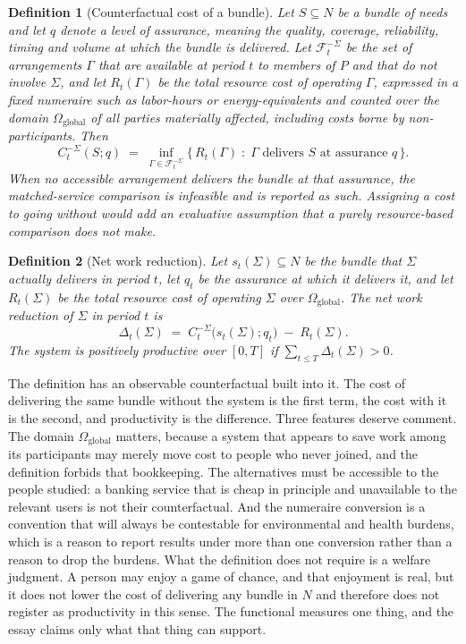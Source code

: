\documentclass[11pt]{article}
\newtheorem{definition}{Definition}
\theoremstyle{remark}
\begin{document}
\begin{definition}[Counterfactual cost of a bundle]\label{def:cost}
Let $S\subseteq N$ be a bundle of needs and let $q$ denote a level of assurance, meaning the quality, coverage, reliability, timing and volume at which the bundle is delivered. Let $\mathcal F_t^{-\Sigma}$ be the set of arrangements $\Gamma$ that are available at period $t$ to members of $P$ and that do not involve $\Sigma$, and let $R_t(\Gamma)$ be the total resource cost of operating $\Gamma$, expressed in a fixed numeraire such as labor-hours or energy-equivalents and counted over the domain $\Omega_{\mathrm{global}}$ of all parties materially affected, including costs borne by non-participants. Then
\[
C_t^{-\Sigma}(S;q)\;=\;\inf_{\Gamma\in\mathcal F_t^{-\Sigma}}\bigl\{\,R_t(\Gamma)\;:\;\Gamma\text{ delivers }S\text{ at assurance }q\,\bigr\}.
\]
When no accessible arrangement delivers the bundle at that assurance, the matched-service comparison is infeasible and is reported as such. Assigning a cost to going without would add an evaluative assumption that a purely resource-based comparison does not make.
\end{definition}

\begin{definition}[Net work reduction]\label{def:delta}
Let $s_t(\Sigma)\subseteq N$ be the bundle that $\Sigma$ actually delivers in period $t$, let $q_t$ be the assurance at which it delivers it, and let $R_t(\Sigma)$ be the total resource cost of operating $\Sigma$ over $\Omega_{\mathrm{global}}$. The net work reduction of $\Sigma$ in period $t$ is
\[
\Delta_t(\Sigma)\;=\;C_t^{-\Sigma}\bigl(s_t(\Sigma);q_t\bigr)\;-\;R_t(\Sigma).
\]
The system is \emph{positively productive over $[0,T]$} if $\sum_{t\le T}\Delta_t(\Sigma)>0$.
\end{definition}

The definition has an observable counterfactual built into it. The cost of delivering the same bundle without the system is the first term, the cost with it is the second, and productivity is the difference. Three features deserve comment. The domain $\Omega_{\mathrm{global}}$ matters, because a system that appears to save work among its participants may merely move cost to people who never joined, and the definition forbids that bookkeeping. The alternatives must be accessible to the people studied: a banking service that is cheap in principle and unavailable to the relevant users is not their counterfactual. And the numeraire conversion is a convention that will always be contestable for environmental and health burdens, which is a reason to report results under more than one conversion rather than a reason to drop the burdens. What the definition does not require is a welfare judgment. A person may enjoy a game of chance, and that enjoyment is real, but it does not lower the cost of delivering any bundle in $N$ and therefore does not register as productivity in this sense. The functional measures one thing, and the essay claims only what that thing can support.
\end{document}
